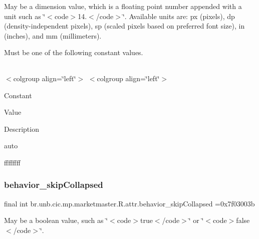 May be a dimension value, which is a floating point number appended with a unit such as \char`\"{}$<$code$>$14.\+5sp$<$/code$>$\char`\"{}. Available units are\+: px (pixels), dp (density-\/independent pixels), sp (scaled pixels based on preferred font size), in (inches), and mm (millimeters). 

Must be one of the following constant values.

\tabulinesep=1mm
\begin{longtabu} spread 0pt [c]{*{0}{|X[-1]}|}
\hline
\end{longtabu}
$<$colgroup align=\char`\"{}left\char`\"{}$>$ $<$colgroup align=\char`\"{}left\char`\"{}$>$ 

Constant

Value

Description 

auto

ffffffff\mbox{\label{classbr_1_1unb_1_1cic_1_1mp_1_1marketmaster_1_1R_1_1attr_a7065315b5d09a30236a28c3a78b14cf7}} 
\subsubsection{\texorpdfstring{behavior\+\_\+skip\+Collapsed}{behavior\_skipCollapsed}}
{\footnotesize\ttfamily final int br.\+unb.\+cic.\+mp.\+marketmaster.\+R.\+attr.\+behavior\+\_\+skip\+Collapsed =0x7f03003b\hspace{0.3cm}{\ttfamily [static]}}

May be a boolean value, such as \char`\"{}$<$code$>$true$<$/code$>$\char`\"{} or \char`\"{}$<$code$>$false$<$/code$>$\char`\"{}. \mbox{\label{classbr_1_1unb_1_1cic_1_1mp_1_1marketmaster_1_1R_1_1attr_ae56a75d4e5154615469edac4257da994}} 
